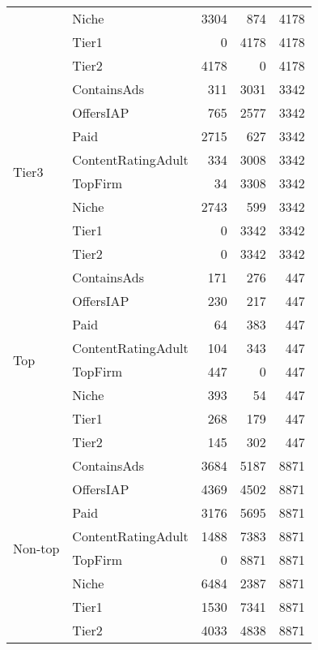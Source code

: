 \begin{longtable}[h!]{llrrr}
        & Niche &  3304 &    874 &   4178 \\
        & Tier1 &     0 &   4178 &   4178 \\
        & Tier2 &  4178 &      0 &   4178 \\
\cline{1-5}
\multirow{8}{*}{Tier3} & ContainsAds &   311 &   3031 &   3342 \\
        & OffersIAP &   765 &   2577 &   3342 \\
        & Paid &  2715 &    627 &   3342 \\
        & ContentRatingAdult &   334 &   3008 &   3342 \\
        & TopFirm &    34 &   3308 &   3342 \\
        & Niche &  2743 &    599 &   3342 \\
        & Tier1 &     0 &   3342 &   3342 \\
        & Tier2 &     0 &   3342 &   3342 \\
\cline{1-5}
\multirow{8}{*}{Top} & ContainsAds &   171 &    276 &    447 \\
        & OffersIAP &   230 &    217 &    447 \\
        & Paid &    64 &    383 &    447 \\
        & ContentRatingAdult &   104 &    343 &    447 \\
        & TopFirm &   447 &      0 &    447 \\
        & Niche &   393 &     54 &    447 \\
        & Tier1 &   268 &    179 &    447 \\
        & Tier2 &   145 &    302 &    447 \\
\cline{1-5}
\multirow{8}{*}{Non-top} & ContainsAds &  3684 &   5187 &   8871 \\
        & OffersIAP &  4369 &   4502 &   8871 \\
        & Paid &  3176 &   5695 &   8871 \\
        & ContentRatingAdult &  1488 &   7383 &   8871 \\
        & TopFirm &     0 &   8871 &   8871 \\
        & Niche &  6484 &   2387 &   8871 \\
        & Tier1 &  1530 &   7341 &   8871 \\
        & Tier2 &  4033 &   4838 &   8871 \\
\end{longtable}
